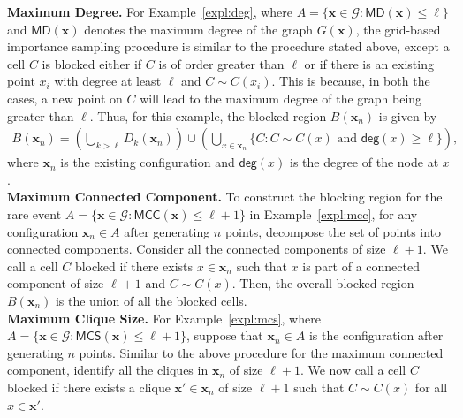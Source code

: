 \documentclass[pdflatex, sn-mathphys-ay]{sn-jnl}%
\renewcommand{\v}[1]{\boldsymbol{#1}}
\newcommand{\cB}{B}
\newcommand{\mx}{\v{x}}
\newcommand{\scG}{\mathscr{G}}
\newcommand{\lt}{\left}
\newcommand{\rt}{\right}
\newcommand{\maxd}{\mathsf{MD}}
\newcommand{\mcc}{\mathsf{MCC}}
\newcommand{\mcs}{\mathsf{MCS}}
\theoremstyle{thmstyleone}%
\theoremstyle{thmstyletwo}%
\theoremstyle{thmstylethree}%
\begin{document}
\noindent
{\bf Maximum Degree.} For Example~\ref{expl:deg}, where $A = \{ \mx \in \scG : \maxd\lt( \mx\rt) \leq \ell\}$ and  $\maxd\lt( \mx\rt)$ denotes the maximum degree of the graph $G(\mx)$, the grid-based importance sampling procedure is similar to the procedure stated above, except a cell $C$ is blocked either if $C$ is of order greater than $\ell$ or if there is an existing point $x_i$ with degree at least $\ell$ and $C \sim C(x_i)$. This is because, in both the cases, a new point on $C$ will lead to {  the maximum degree of the graph being greater than $\ell$}. Thus, 
 for this example, the blocked region $\cB(\mx_n)$ is given by
\begin{align*}
\cB(\mx_n) = \lt(\bigcup_{k > \ell} D_{k}(\mx_n)\rt) \cup \lt( \bigcup_{x \in \mx_n} \{C : C \sim C(x)\,\, \text{and}\,\, \mathsf{deg}(x) \geq \ell  \}\rt),
\end{align*}
where $\mx_n$ is the existing configuration and $\mathsf{deg}(x)$ is the degree of the node at $x$.\\

\noindent
{\bf Maximum Connected Component.}  To construct the blocking region for the rare event $A = \{ \mx \in \scG : \mcc\lt( \mx\rt) \leq \ell +1\}$ 
in Example~\ref{expl:mcc}, for any configuration $\mx_n \in A$ after generating $n$ points, decompose the set of points into connected components. Consider all the connected components of size $\ell + 1$. We call a cell $C$ blocked if there exists $x \in \mx_n$ such that $x$ is part of a connected component of size $\ell +1$ and $C \sim C(x)$. Then, the overall blocked region $\cB(\mx_n)$ is the union of all the blocked cells.\\

\noindent
{\bf Maximum Clique Size.}  For Example~\ref{expl:mcs}, where $A = \{ \mx \in \scG : \mcs( \mx) \leq \ell + 1\}$, suppose that  $\mx_n \in A$ is the configuration after generating $n$ points. Similar to the above procedure for the maximum connected component, identify all the cliques in $\mx_n$ of size $\ell + 1$. We now call a cell $C$ blocked if there exists a clique $\mx' \in \mx_n$ of size $\ell+1$ such that $C \sim C(x)$ for all $x \in \mx'$.\\
\end{document}
